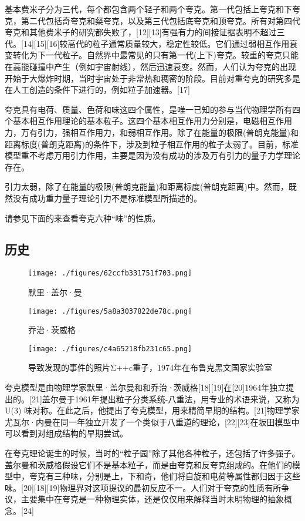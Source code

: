 基本费米子分为三代，每个都包含两个轻子和两个夸克。第一代包括上夸克和下夸克，第二代包括奇夸克和粲夸克，以及第三代包括底夸克和顶夸克。所有对第四代夸克和其他费米子的研究都失败了，[12][13]有强有力的间接证据表明不超过三代。[14][15][16]较高代的粒子通常质量较大，稳定性较低。它们通过弱相互作用衰变转化为下一代粒子。自然界中最常见的只有第一代(上下)夸克。较重的夸克只能在高能碰撞中产生（例如宇宙射线），然后迅速衰变。然而，人们认为夸克的出现开始于大爆炸时期，当时宇宙处于非常热和稠密的阶段。目前对重夸克的研究多是在人工创造的条件下进行的，例如粒子加速器。[17]

夸克具有电荷、质量、色荷和味这四个属性，是唯一已知的参与当代物理学所有四个基本相互作用理论的基本粒子。这四个基本相互作用力分别是，电磁相互作用力，万有引力，强相互作用力，和弱相互作用。除了在能量的极限(普朗克能量)和距离标度(普朗克距离)的条件下，涉及到粒子相互作用的粒子太弱了。目前，标准模型重不考虑万用引力作用，主要是因为没有成功的涉及万有引力的量子力学理论存在。

引力太弱，除了在能量的极限(普朗克能量)和距离标度(普朗克距离)中。然而，既然没有成功重力量子理论引力不是标准模型所描述的。

请参见下面的来查看夸克六种“味”的性质。

\subsection{历史}
\begin{figure}[ht]
\centering
\texttt{[image: ./figures/62ccfb331751f703.png]}
\caption{默里·盖尔·曼} \label{fig_Quark_2}
\end{figure}

\begin{figure}[ht]
\centering
\texttt{[image: ./figures/5a8a3037822de78c.png]}
\caption{乔治·茨威格} \label{fig_Quark_3}
\end{figure}

\begin{figure}[ht]
\centering
\texttt{[image: ./figures/c4a65218fb231c65.png]}
\caption{导致发现的事件的照片Σ++c重子，1974年在布鲁克黑文国家实验室} \label{fig_Quark_4}
\end{figure}
夸克模型是由物理学家默里·盖尔曼和和乔治·茨威格[18][19]在[20]1964年独立提出的。[21]盖尔曼于1961年提出粒子分类系统-八重法，用专业的术语来说，又称为U(3) 味对称。在此之后，他提出了夸克模型，用来精简早期的结构。[21]物理学家尤瓦尔·内曼在同一年独立开发了一个类似于八重道的理论，[22][23]在坂田模型中可以看到对组成结构的早期尝试。

在夸克理论诞生的时候，当时的“粒子园”除了其他各种粒子，还包括了许多强子。盖尔曼和茨威格假设它们不是基本粒子，而是由夸克和反夸克组成的。在他们的模型中，夸克有三种味，分别是上，下和奇，他们将自旋和电荷等属性都归因于这些味。[20][18][19]物理界对这项提议的最初反应不一。人们对于夸克的性质有所争议，主要集中在夸克是一种物理实体，还是仅仅用来解释当时未明物理的抽象概念。[24]

